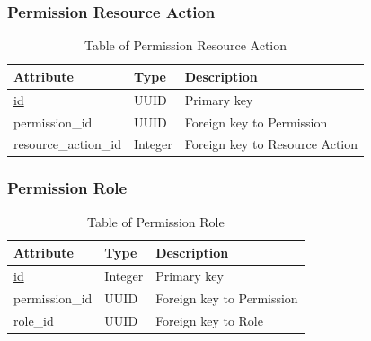 \subsubsection{Permission Resource Action}
\begin{table}[H]
    \centering
    \begin{tabular}{|p{3cm}|p{2cm}|p{\dimexpr\textwidth-6.8cm}|} %
        \hline
        \rowcolor[HTML]{C0C0C0} 
        \textbf{Attribute} & \textbf{Type} & \textbf{Description} \\ \hline
        \underline{id} & UUID & Primary key \\ \hline
        permission\_id & UUID & Foreign key to Permission \\ \hline
        resource\_action\_id & Integer & Foreign key to Resource Action \\ \hline
    \end{tabular}
    \caption{Table of Permission Resource Action}
    \label{tab:permission-resource-action-table}
\end{table}

\subsubsection{Permission Role}
\begin{table}[H]
    \centering
    \begin{tabular}{|p{3cm}|p{2cm}|p{\dimexpr\textwidth-6.8cm}|} %
        \hline
        \rowcolor[HTML]{C0C0C0} 
        \textbf{Attribute} & \textbf{Type} & \textbf{Description} \\ \hline
        \underline{id} & Integer & Primary key \\ \hline
        permission\_id & UUID & Foreign key to Permission \\ \hline
        role\_id & UUID & Foreign key to Role \\ \hline
    \end{tabular}
    \caption{Table of Permission Role}
    \label{tab:permission-role-table}
\end{table}

